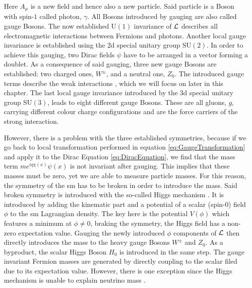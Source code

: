 Here $A_\mu$ is a new field and hence also a new particle. Said particle is a \gls{Boson} with spin-$1$ called photon, $\gamma$. All \glspl{Boson} introduced by gauging are also called gauge \glspl{Boson}. The now established $\text{U}(1)$ invariance of $\mathcal{L}$ describes all electromagnetic interactions between \glspl{Fermion} and photons. Another local gauge invariance is established using the \gls{2d} special unitary group $\text{SU}(2)$. In order to achieve this gauging, two Dirac fields $\psi$ have to be arranged in a vector forming a doublet. As a consequence of said gauging, three new gauge \glspl{Boson} are established: two charged ones, $W^{\pm}$, and a neutral one, $Z_0$. The introduced gauge terms describe the weak interactions \cite{ElectroweakGlashow,ElectroweakSalam,ElectroweakWeinberg}, which we will focus on later in this chapter. The last local gauge invariance introduced by the \gls{3d} special unitary group $\text{SU}(3)$, leads to eight different gauge \glspl{Boson}. These are all gluons, $g$, carrying different colour charge configurations and are the force carriers of the strong interaction. 

However, there is a problem with the three established symmetries, because if we go back to local transformation performed in equation \ref{eq:GaugeTransformation} and apply it to the Dirac Equation \ref{eq:DiracEquation}, we find that the mass term $m e^{iq\chi(x)} \psi(x)$ is not invariant after gauging. This implies that these masses must be zero, yet we are able to measure particle masses. For this reason, the symmetry of the \gls{sm} has to be broken in order to introduce the mass. Said broken symmetry is introduced with the so-called Higgs mechanism \cite{HiggsProperties,HiggsTheory1,HiggsTheory2}. It is introduced by adding the kinematic part and a potential of a scalar (spin-0) field $\phi$ to the \gls{sm} Lagrangian density. The key here is the potential $V(\phi)$ which features a minimum at $\phi \neq 0$, braking the symmetry, \ie the Higgs field has a non-zero expectation value. Gauging the newly introduced $\phi$ components of $\mathcal{L}$ then directly introduces the mass to the heavy gauge \glspl{Boson} $W^{\pm}$ and $Z_0$. As a byproduct, the scalar Higgs \gls{Boson} $H_0$ is introduced in the same step. The gauge invariant \gls{Fermion} masses are generated by directly coupling to the scalar filed due to its expectation value. However, there is one exception since the Higgs mechanism is unable to explain neutrino mass \cite{ModernParticlePhysics}.

